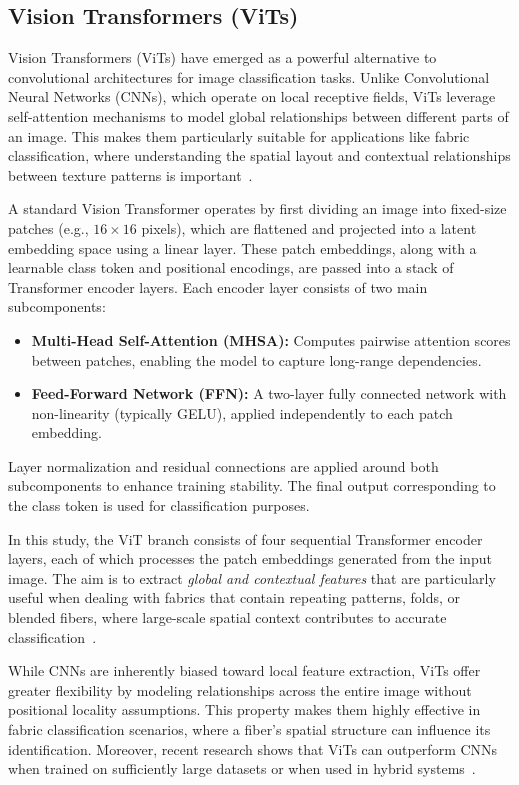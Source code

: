 \subsection{Vision Transformers (ViTs)}

Vision Transformers (ViTs) have emerged as a powerful alternative to convolutional architectures for image classification tasks. Unlike Convolutional Neural Networks (CNNs), which operate on local receptive fields, ViTs leverage self-attention mechanisms to model global relationships between different parts of an image. This makes them particularly suitable for applications like fabric classification, where understanding the spatial layout and contextual relationships between texture patterns is important~\cite{dosovitskiy2020vit}.

A standard Vision Transformer operates by first dividing an image into fixed-size patches (e.g., $16 \times 16$ pixels), which are flattened and projected into a latent embedding space using a linear layer. These patch embeddings, along with a learnable class token and positional encodings, are passed into a stack of Transformer encoder layers. Each encoder layer consists of two main subcomponents:
\begin{itemize}
    \item \textbf{Multi-Head Self-Attention (MHSA):} Computes pairwise attention scores between patches, enabling the model to capture long-range dependencies.
    \item \textbf{Feed-Forward Network (FFN):} A two-layer fully connected network with non-linearity (typically GELU), applied independently to each patch embedding.
\end{itemize}

Layer normalization and residual connections are applied around both subcomponents to enhance training stability. The final output corresponding to the class token is used for classification purposes.

In this study, the ViT branch consists of four sequential Transformer encoder layers, each of which processes the patch embeddings generated from the input image. The aim is to extract \textit{global and contextual features} that are particularly useful when dealing with fabrics that contain repeating patterns, folds, or blended fibers, where large-scale spatial context contributes to accurate classification~\cite{chitra2023fabric, siam2023textilenet}.

While CNNs are inherently biased toward local feature extraction, ViTs offer greater flexibility by modeling relationships across the entire image without positional locality assumptions. This property makes them highly effective in fabric classification scenarios, where a fiber's spatial structure can influence its identification. Moreover, recent research shows that ViTs can outperform CNNs when trained on sufficiently large datasets or when used in hybrid systems~\cite{dosovitskiy2020vit, touvron2021training}.

